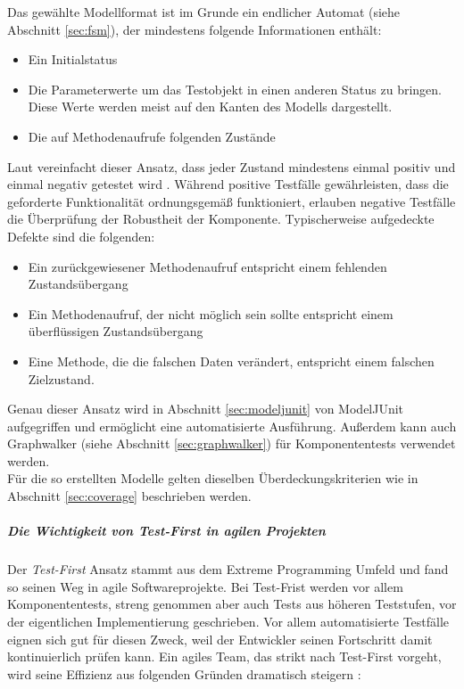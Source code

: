 Das gewählte Modellformat ist im Grunde ein endlicher Automat (siehe Abschnitt \ref{sec:fsm}), der mindestens folgende Informationen enthält:

\begin{itemize}
\item Ein Initialstatus
\item Die Parameterwerte um das Testobjekt in einen anderen Status zu bringen. Diese Werte werden meist auf den Kanten des Modells dargestellt.
\item Die auf Methodenaufrufe folgenden Zustände
\end{itemize}

Laut \citeauthor{vigenschow_objektorientiertes_2004} vereinfacht dieser Ansatz, dass jeder Zustand mindestens einmal positiv und einmal negativ getestet wird \cite{vigenschow_objektorientiertes_2004}. Während positive Testfälle gewährleisten, dass die geforderte Funktionalität ordnungsgemäß funktioniert, erlauben negative Testfälle die Überprüfung der Robustheit der Komponente. Typischerweise aufgedeckte Defekte sind die folgenden:

\begin{itemize}
\item Ein zurückgewiesener Methodenaufruf entspricht einem fehlenden Zustandsübergang
\item Ein Methodenaufruf, der nicht möglich sein sollte entspricht einem überflüssigen Zustandsübergang
\item Eine Methode, die die falschen Daten verändert, entspricht einem falschen Zielzustand.
\end{itemize}

Genau dieser Ansatz wird in Abschnitt \ref{sec:modeljunit} von ModelJUnit aufgegriffen und ermöglicht eine automatisierte Ausführung. Außerdem kann auch Graphwalker (siehe Abschnitt \ref{sec:graphwalker}) für Komponententests verwendet werden.\\
Für die so erstellten Modelle gelten dieselben Überdeckungskriterien wie in Abschnitt \ref{sec:coverage} beschrieben werden.

\subparagraph{Die Wichtigkeit von Test-First in agilen Projekten}  

Der \textit{Test-First} Ansatz stammt aus dem Extreme Programming Umfeld \cite{beck_extreme_2000} und fand so seinen Weg in agile Softwareprojekte. Bei Test-Frist werden vor allem Komponententests, streng genommen aber auch Tests aus höheren Teststufen, vor der eigentlichen Implementierung geschrieben. Vor allem automatisierte Testfälle eignen sich gut für diesen Zweck, weil der Entwickler seinen Fortschritt damit kontinuierlich prüfen kann. Ein agiles Team, das strikt nach Test-First vorgeht, wird seine Effizienz aus folgenden Gründen dramatisch steigern \cite{linz_testing_2014}:

